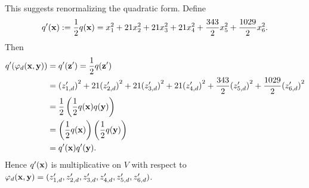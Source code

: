 \documentclass[a4paper, 11pt]{amsart}
\theoremstyle{plain}
\theoremstyle{definition}
\numberwithin{equation}{section}
\begin{document}
This suggests renormalizing the quadratic form. Define
\[
q^\prime({\bf x}):=\frac{1}{2}q({\bf x})
=x_1^2+21x_2^2+21x_3^2+21x_4^2+\frac{343}{2}x_5^2+\frac{1029}{2}x_6^2.
\]
Then
\begin{align*}
q^\prime(\varphi_d({\bf x},{\bf y}))
&=q^\prime({\bf z}^{\prime})
=\frac{1}{2}q({\bf z}^{\prime})\\
&={(z_{1,d}^{\prime})}^2+21{(z_{2,d}^{\prime})}^2+21{(z_{3,d}^{\prime})}^2+21{(z_{4,d}^{\prime})}^2+\frac{343}{2}{(z_{5,d}^{\prime})}^2+\frac{1029}{2}{(z_{6,d}^{\prime})}^2\\
&=\frac{1}{2}\left(\frac{1}{2}q({\bf x})q({\bf y})\right)\\
&=\left(\frac{1}{2}q({\bf x})\right)\left(\frac{1}{2}q({\bf y})\right)\\
&=q^\prime({\bf x})q^\prime({\bf y}).
\end{align*}
Hence $q^\prime({\bf x})$ is multiplicative on $V$ with respect to $\varphi_d({\bf x},{\bf y})=(z_{1,d}^{\prime},z_{2,d}^{\prime},z_{3,d}^{\prime},z_{4,d}^{\prime},z_{5,d}^{\prime},z_{6,d}^{\prime})$.
\end{document}

